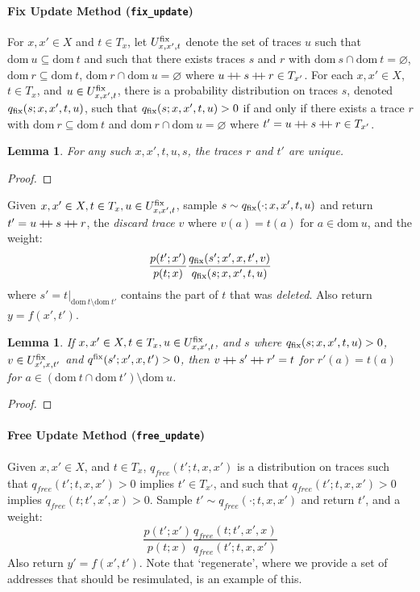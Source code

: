 \documentclass{article}
\newtheorem{lemma}[theorem]{Lemma}
\newcommand{\code}[1]{\texttt{\small{\textbf{#1}}}}
\newcommand\doubleplus{\mathbin{+\mkern-5mu+}}
\newcommand{\concat}[0]{\doubleplus}
\newcommand{\dom}[1]{\mbox{dom}{~#1}}
\newcommand{\fix}[0]{\mbox{\scriptsize fix}}
\begin{document}
\paragraph{Fix Update Method (\code{fix\_update})}
For $x, x' \in X$ and $t \in T_x$, let $U^{\fix}_{x,x',t}$ denote the set of traces $u$ such that $\dom{u} \subseteq \dom{t}$ and such that there exists traces $s$ and $r$ with $\dom{s} \cap \dom{t} = \varnothing$, $\dom{r} \subseteq \dom{t}$, $\dom{r} \cap \dom{u} = \varnothing$ where $u \concat s \concat r \in T_{x'}$.
For each $x, x' \in X$, $t \in T_x$, and $u \in U^{\fix}_{x,x',t}$, there is a probability distribution on traces $s$, denoted $q_{\fix}(s; x, x', t, u)$, such that $q_{\fix}(s; x, x', t, u) > 0$ if and only if there exists a trace $r$ with $\dom{r} \subseteq \dom{t}$ and $\dom{r} \cap \dom{u} = \varnothing$ where $t' = u \concat s \concat r \in T_{x'}$.

\begin{lemma} \label{lemma:fix-update-unique}
For any such $x, x', t, u, s$, the traces $r$ and $t'$ are unique.
\end{lemma}
\begin{proof}
\end{proof}

Given $x, x' \in X, t \in T_x, u \in U^{\fix}_{x,x',t}$, sample $s \sim q_{\fix}(\cdot; x, x', t, u)$ and return $t' = u \concat s \concat r$, the \emph{discard trace} $v$ where $v(a) = t(a)$ for $a \in \dom{u}$, and the weight:
\[
\frac{p(t'; x')}{p(t; x)} \frac{q_{\fix}(s'; x', x, t', v)}{q_{\fix}(s; x, x', t, u)}
\]
where $s' = t|_{\dom{t} \setminus \dom{t'}}$ contains the part of $t$ that was \emph{deleted}.
Also return $y = f(x', t')$.

\begin{lemma} \label{lemma:fix-update-reverse}
If $x, x' \in X, t \in T_x, u \in U^{\fix}_{x, x', t}$, and $s$ where $q_{\fix}(s; x, x', t, u) > 0$, $v \in U^{\fix}_{x',x,t'}$ and $q^{\fix}(s'; x', x, t') > 0$, then $v \concat s' \concat r' = t$ for $r'(a) = t(a)$ for $a \in (\dom{t} \cap \dom{t'}) \setminus \dom{u}$.
\end{lemma}
\begin{proof}
\end{proof}


\paragraph{Free Update Method (\code{free\_update})}
Given $x, x' \in X$, and $t \in T_x$, $q_{free}(t'; t, x, x')$ is a distribution on traces such that $q_{free}(t'; t, x, x') > 0$ implies $t' \in T_{x'}$, and such that $q_{free}(t'; t, x, x') > 0$ implies $q_{free}(t; t', x', x) > 0$.
Sample $t' \sim q_{free}(\cdot; t, x, x')$ and return $t'$, and a weight:
\[
    \frac{p(t'; x')}{p(t; x)} \frac{q_{free}(t; t', x', x)}{q_{free}(t'; t, x, x')}
\]
Also return $y' = f(x', t')$.
Note that `regenerate', where we provide a set of addresses that should be resimulated, is an example of this.
\end{document}
